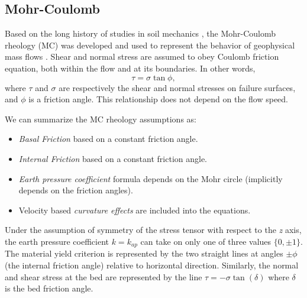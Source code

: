 \documentclass[nhess, manuscript]{copernicus}
\begin{document}
\subsection{Mohr-Coulomb}\label{MCM}
Based on the long history of studies in soil mechanics \citep{Rankine1857,DruckerPage52}, the Mohr-Coulomb rheology (MC) was developed and used to represent the behavior of geophysical mass flows \citep{SavageHutter1989}. Shear and normal stress are assumed to obey Coulomb friction equation, both within the flow and at its boundaries. In other words,
\begin{equation}
\tau = \sigma \tan \phi,
\end{equation}
where $\tau$ and $\sigma$ are respectively the shear and normal stresses on failure surfaces, and $\phi$ is a friction angle. This relationship does not depend on the flow speed.

We can summarize the MC rheology assumptions as:
\begin{itemize}
\item \textit{Basal Friction} based on a constant friction angle.

\item \textit{Internal Friction} based on a constant friction angle.

\item \textit{Earth pressure coefficient} formula depends on the Mohr circle (implicitly depends on the friction angles).

\item Velocity based \textit{curvature effects} are included into the equations.
\end{itemize}

Under the assumption of symmetry of the stress tensor with respect to the \textit{z} axis, the earth pressure coefficient $k=k_{ap}$ can take on only one of three values $\{ 0, \pm 1\}$. The material yield criterion is represented by the two straight lines at angles $\pm \phi$ (the internal friction angle) relative to horizontal direction. Similarly, the normal and shear stress at the bed are represented by the line $\tau=-\sigma \tan(\delta)$ where $\delta$ is the bed friction angle.
\end{document}
